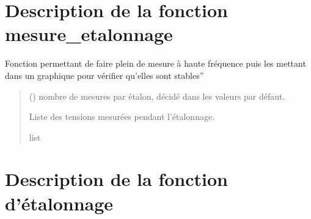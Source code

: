 \documentclass[letterpaper,10pt,french]{sphinxmanual}
\begin{document}
\section{Description de la fonction mesure\_etalonnage}
\label{\detokenize{Documentation:description-de-la-fonction-mesure-etalonnage}}

\begin{fulllineitems}
\label{\detokenize{Documentation:ADNI_ProgrammePython.mesure_etalonnage}}
\pysigstartsignatures
{}
\pysigstopsignatures
\sphinxAtStartPar
Fonction permettant de faire plein de mesure à haute fréquence puis les mettant dans un graphique pour vérifier qu’elles sont stables”
\begin{quote}\begin{description}
\sphinxAtStartPar
{} () \textendash{} nombre de mesures par étalon, décidé dans les valeurs par défaut.

\sphinxAtStartPar
{} \textendash{} Liste des tensions mesurées pendant l’étalonnage.

\sphinxAtStartPar
list

\end{description}\end{quote}

\end{fulllineitems}



\section{Description de la fonction d’étalonnage}
\label{\detokenize{Documentation:description-de-la-fonction-d-etalonnage}}
\end{document}
